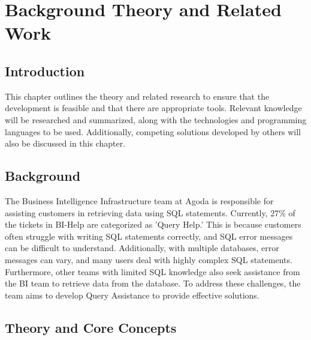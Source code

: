 \chapter{Background Theory and Related Work}






\section{Introduction}
This chapter outlines the theory and related research to ensure that the development is feasible and that there are appropriate tools. Relevant knowledge will be researched and summarized, along with the technologies and programming languages to be used. Additionally, competing solutions developed by others will also be discussed in this chapter.

\section{Background}
The Business Intelligence Infrastructure team at Agoda is responsible for assisting customers in retrieving data using SQL statements. Currently, 27\% of the tickets in BI-Help are categorized as 'Query Help.' This is because customers often struggle with writing SQL statements correctly, and SQL error messages can be difficult to understand. Additionally, with multiple databases, error messages can vary, and many users deal with highly complex SQL statements. Furthermore, other teams with limited SQL knowledge also seek assistance from the BI team to retrieve data from the database. To address these challenges, the team aims to develop Query Assistance to provide effective solutions.
\section{Theory and Core Concepts}
